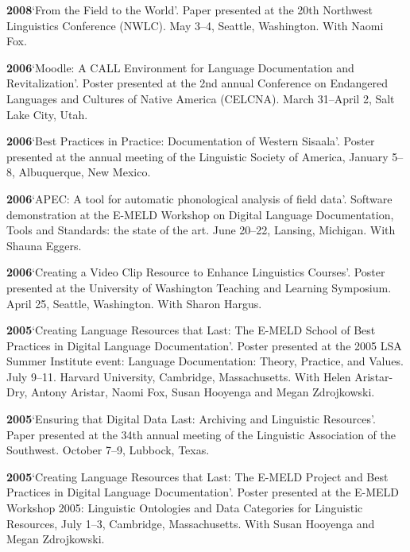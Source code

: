 \documentclass[11pt]{article}
\newcommand{\hangpara}{
 \setlength{\parindent}{0in} %
 \hangindent=0.42in %
}
\begin{document}
\vskip 6pt
\hangpara
{\bf 2008}\hspace{1ex}`From the Field to the World'. Paper presented at the 20th Northwest Linguistics Conference (NWLC). May 3--4, Seattle, Washington. With Naomi Fox.

\vskip 6pt
\hangpara
{\bf 2006}\hspace{1ex}`Moodle: A CALL Environment for Language Documentation and Revitalization'. Poster presented at the 2nd annual Conference on Endangered Languages and Cultures of Native America (CELCNA). March 31--April 2, Salt Lake City, Utah.

\vskip 6pt
\hangpara
{\bf 2006}\hspace{1ex}`Best Practices in Practice: Documentation of Western Sisaala'. Poster presented at the annual meeting of the Linguistic Society of America, January 5--8, Albuquerque, New Mexico.

\vskip 6pt
\hangpara
{\bf 2006}\hspace{1ex}`APEC: A tool for automatic phonological analysis of field data'. Software demonstration at the E-MELD Workshop on Digital Language Documentation, Tools and Standards: the state of the art. June 20--22, Lansing, Michigan. With Shauna Eggers.

\vskip 6pt
\hangpara
{\bf 2006}\hspace{1ex}`Creating a Video Clip Resource to Enhance Linguistics Courses'. Poster presented at the University of Washington Teaching and Learning Symposium. April 25, Seattle, Washington. With Sharon Hargus.

\vskip 6pt
\hangpara
{\bf 2005}\hspace{1ex}`Creating Language Resources that Last: The E-MELD School of Best Practices in Digital Language Documentation'. Poster presented at the 2005 LSA Summer Institute event: Language Documentation: Theory, Practice, and Values. July 9--11. Harvard University, Cambridge, Massachusetts. With Helen Aristar-Dry, Antony Aristar, Naomi Fox, Susan Hooyenga and Megan Zdrojkowski.

\vskip 6pt
\hangpara
{\bf 2005}\hspace{1ex}`Ensuring that Digital Data Last: Archiving and Linguistic Resources'. Paper presented at the 34th annual meeting of the Linguistic Association of the Southwest. October 7--9, Lubbock, Texas. 
 
\vskip 6pt
\hangpara
{\bf 2005}\hspace{1ex}`Creating Language Resources that Last: The E-MELD Project and Best Practices in Digital Language Documentation'. Poster presented at the E-MELD Workshop 2005: Linguistic Ontologies and Data Categories for Linguistic Resources, July 1--3, Cambridge, Massachusetts. With Susan Hooyenga and Megan Zdrojkowski.
\end{document}
